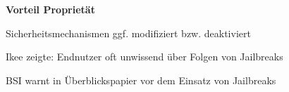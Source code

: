\begin{frame}
	\centering
	\textbf{Vorteil Proprietät}
	\begin{block}{}
		Sicherheitsmechanismen ggf. modifiziert bzw. deaktiviert
	\end{block}
	\begin{block}{}
		 Ikee zeigte: Endnutzer oft unwissend über Folgen von Jailbreaks
	\end{block}
	\begin{block}{}
		BSI warnt in Überblickspapier vor dem Einsatz von Jailbreaks
	\end{block}

\end{frame}